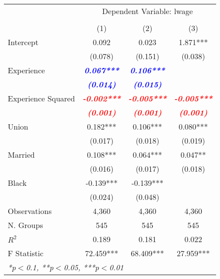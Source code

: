 \begin{table}[!ht]
  \centering
\begin{tabular}{lccc}
  \toprule
  \toprule
  & \multicolumn{3}{c}{Dependent Variable: lwage} \\
  \cmidrule(lr){2-4} \\
   & (1) & (2) & (3)\\
  \midrule
  Intercept & 0.092 & 0.023 & 1.871*** \\
   & (0.078) & (0.151) & (0.038) \\
  Experience & \textbf{\textit{\textcolor{blue}{ 0.067***}}} & \textbf{\textit{\textcolor{blue}{ 0.106***}}} & \textbf{\textit{\textcolor{blue}{}}} \\
   & \textbf{\textit{\textcolor{blue}{(0.014)}}} & \textbf{\textit{\textcolor{blue}{(0.015)}}} & \textbf{\textit{\textcolor{blue}{}}} \\
  Experience Squared & \textbf{\textit{\textcolor{red}{-0.002***}}} & \textbf{\textit{\textcolor{red}{-0.005***}}} & \textbf{\textit{\textcolor{red}{-0.005***}}} \\
   & \textbf{\textit{\textcolor{red}{(0.001)}}} & \textbf{\textit{\textcolor{red}{(0.001)}}} & \textbf{\textit{\textcolor{red}{(0.001)}}} \\
  Union & 0.182*** & 0.106*** & 0.080*** \\
   & (0.017) & (0.018) & (0.019) \\
  Married & 0.108*** & 0.064*** & 0.047** \\
   & (0.016) & (0.017) & (0.018) \\
  Black & -0.139*** & -0.139*** &  \\
   & (0.024) & (0.048) &  \\
  \midrule
  Observations & 4,360 & 4,360 & 4,360 \\
  N. Groups & 545 & 545 & 545 \\
  $R^2$ & 0.189 & 0.181 & 0.022 \\
  F Statistic & 72.459*** & 68.409*** & 27.959*** \\
  \bottomrule
  \multicolumn{4}{l}{{\small \textit{*p$<$0.1, **p$<$0.05, ***p$<$0.01}}}\\
\end{tabular}
\end{table}
